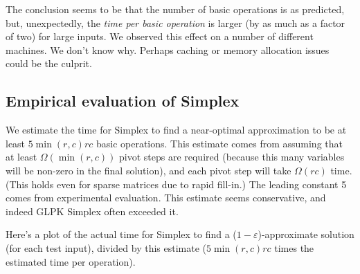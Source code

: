 \documentclass[11pt]{svjour3} \usepackage{fullpage}
\newcommand{\eps}{\varepsilon}
\begin{document}
The conclusion seems to be that
the number of basic operations is as predicted,
but, unexpectedly,
the {\em time per basic operation}
is larger (by as much as a factor of two) for large inputs.
We observed this effect on a number of different machines.  
We don't know why.
Perhaps caching or memory allocation issues could be the culprit.

\subsection{Empirical evaluation of Simplex}

We estimate the time for Simplex to find a near-optimal approximation to be
at least $5\min(r,c)rc$ basic operations.
This estimate comes from assuming that at least $\Omega(\min(r,c))$ pivot steps are required (because this many variables will be non-zero in the final solution), and each pivot step will take $\Omega(rc)$ time.  (This holds even for sparse matrices due to rapid fill-in.)
The leading constant 5 comes from experimental evaluation.
This estimate seems conservative, and indeed GLPK Simplex often exceeded it.

Here's a plot of the actual time for Simplex to find a ($1-\eps$)-approximate solution
(for each test input),
divided by this estimate
($5\min(r,c)rc$ times the estimated time per operation).
\end{document}
